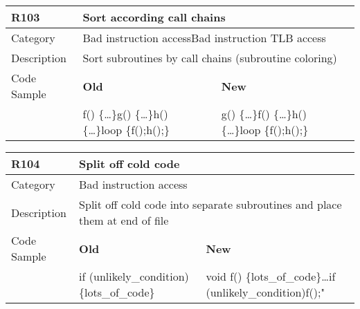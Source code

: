 \begin{tabular}{|p{0.9in}|p{2.0in}|p{2.0in}|} \hline
\textbf{R103}       & \multicolumn{2}{|p{4.0in}|}{\textbf{Sort according call chains}} \\ \hline
Category            & \multicolumn{2}{|p{4.0in}|}{Bad instruction access\newline Bad instruction TLB access } \\ \hline
Description         & \multicolumn{2}{|p{4.0in}|}{Sort subroutines by call chains (subroutine coloring)} \\ \hline
Code Sample         & \textbf{Old} & \textbf{New} \\ \hline
                    & f() \{\ldots\}\newline g() \{\ldots\}\newline h() \{\ldots\}\newline loop \{\newline   f();\newline   h();\newline \}
                    & g() \{\ldots\}\newline f() \{\ldots\}\newline h() \{\ldots\}\newline loop \{\newline   f();\newline   h();\newline \} \\ \hline
\end{tabular}

\begin{tabular}{|p{0.9in}|p{2.0in}|p{2.0in}|} \hline
\textbf{R104}       & \multicolumn{2}{|p{4.0in}|}{\textbf{Split off cold code}} \\ \hline
Category            & \multicolumn{2}{|p{4.0in}|}{Bad instruction access} \\ \hline
Description         & \multicolumn{2}{|p{4.0in}|}{Split off cold code into separate subroutines and place them at end of file } \\ \hline
Code Sample         & \textbf{Old} & \textbf{New} \\ \hline
                    & if (unlikely\_condition) \{\newline   lots\_of\_code\newline \}
                    & void f() \{lots\_of\_code\}\newline \ldots\newline if (unlikely\_condition)\newline   f();" \\ \hline
\end{tabular}

